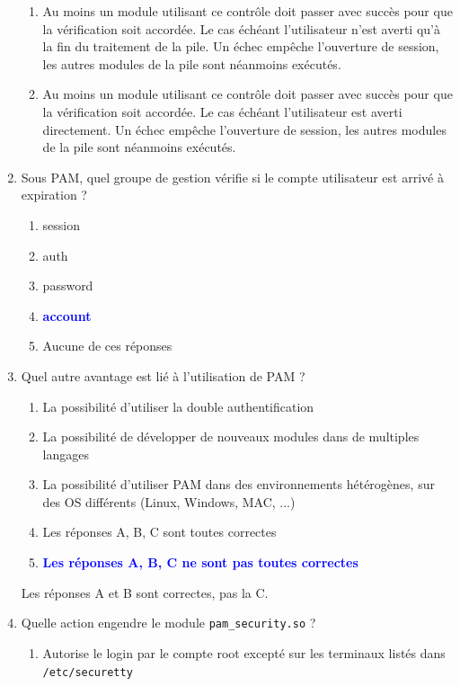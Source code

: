 \documentclass[a4paper]{article}
\begin{document}
\begin{enumerate}
\begin{enumerate}
        \item Au moins un module utilisant ce contrôle doit passer avec succès pour que la vérification soit accordée. Le cas échéant l'utilisateur n'est averti qu'à la fin du traitement de la pile. Un échec empêche l'ouverture de session, les autres modules de la pile sont néanmoins exécutés.
        \item Au moins un module utilisant ce contrôle doit passer avec succès pour que la vérification soit accordée. Le cas échéant l'utilisateur est averti directement. Un échec empêche l'ouverture de session, les autres modules de la pile sont néanmoins exécutés.
    \end{enumerate}
    \item Sous PAM, quel groupe de gestion vérifie si le compte utilisateur est arrivé à expiration ?
    \begin{enumerate}
        \item session
        \item auth
        \item password
        \item \textcolor{blue}{\textbf{account}}
        \item Aucune de ces réponses
    \end{enumerate}
    \item Quel autre avantage est lié à l'utilisation de PAM ?
    \begin{enumerate}
        \item La possibilité d'utiliser la double authentification
        \item La possibilité de développer de nouveaux modules dans de multiples langages
        \item La possibilité d'utiliser PAM dans des environnements hétérogènes, sur des OS différents (Linux, Windows, MAC, ...)
        \item Les réponses A, B, C sont toutes correctes
        \item \textcolor{blue}{\textbf{Les réponses A, B, C ne sont pas toutes correctes}}
    \end{enumerate}
    \begin{example} Les réponses A et B sont correctes, pas la C. \end{example}
    \item Quelle action engendre le module \texttt{pam\_security.so} ?
    \begin{enumerate}
        \item Autorise le login par le compte root excepté sur les terminaux listés dans \texttt{/etc/securetty}

\end{enumerate}
\end{enumerate}
\end{document}
